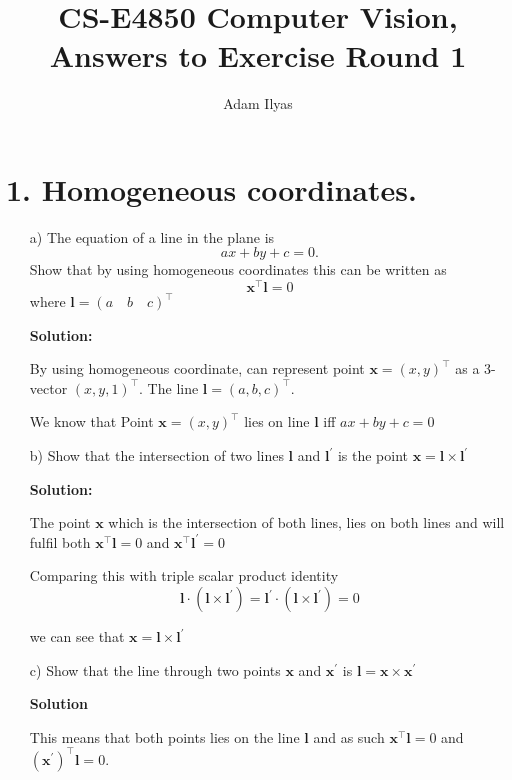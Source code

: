 \documentclass[a4paper,12pt]{article}
\author{Adam Ilyas}
\title{
CS-E4850 Computer Vision, \\
Answers to Exercise Round 1
}
\begin{document}
\vspace{8pt}

\maketitle

\section*{1. Homogeneous coordinates.}
\begin{itemize}
\item[a)] The equation of a line in the plane is $$ax + by + c = 0.$$
Show that by using homogeneous coordinates this can be written as $$\mathbf{x}^\intercal \mathbf{l} = 0$$ where $\mathbf{l} = (a \quad b \quad c)^\intercal$

\textbf{Solution:}

By using homogeneous coordinate, can represent point $\mathbf{x} = (x, y)^\intercal$ as a 3-vector $(x, y, 1)^\intercal$. The line $\mathbf{l} = (a, b, c)^\intercal$.

We know that Point $\mathbf{x} = (x, y)^\intercal$ lies on line $\mathbf{l}$ iff $ax + by + c = 0$

\item[b)]  Show that the intersection of two lines $\mathbf{l}$ and $\mathbf{l}^\prime$ is the point $\mathbf{x} = \mathbf{l} \times \mathbf{l}^\prime$

\textbf{Solution:}

The point $\mathbf{x}$ which is the intersection of both lines, lies on both lines and will fulfil both $\mathbf{x}^\intercal \mathbf{l} = 0$ and $\mathbf{x}^\intercal \mathbf{l}^\prime = 0$

Comparing this with triple scalar product identity $$\mathbf{l} \cdot (\mathbf{l}\times \mathbf{l}^\prime ) = \mathbf{l}^\prime \cdot (\mathbf{l}\times \mathbf{l}^\prime) = 0$$	

we can see that $\mathbf{x} = \mathbf{l} \times \mathbf{l}^\prime$

\item[c)]  Show that the line through two points $\mathbf{x}$ and $\mathbf{x}^\prime$ is $\mathbf{l} = \mathbf{x} \times \mathbf{x}^\prime $

\textbf{Solution}

This means that both points lies on the line  $\mathbf{l}$ and as such $\mathbf{x}^\intercal \mathbf{l} = 0$ and $(\mathbf{x}^\prime)^\intercal \mathbf{l} = 0$.


\end{itemize}
\end{document}
